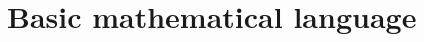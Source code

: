 \documentclass[12pt]{book}
\newcommand{\eqdef}{\textbf{:=}}
\begin{document}
\tableofcontents






\chapter{Basic mathematical language}
\end{document}

